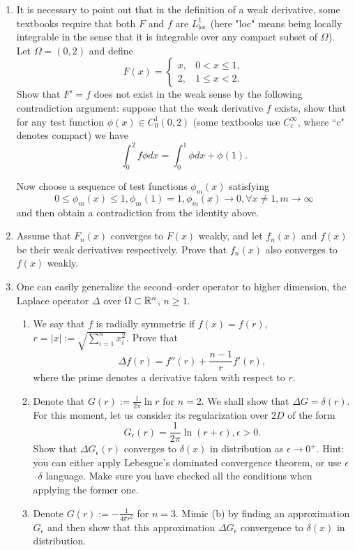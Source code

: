 \documentclass[6pt]{article}
\numberwithin{equation}{section}
\def\mathbb{\Bbb}
\begin{document}
\begin{enumerate}
\item It is necessary to point out that in the definition of a weak derivative, some textbooks require that both $F$ and $f$ are $L^1_{\text{loc}}$ (here "loc" means being locally integrable in the sense that it is integrable over any compact subset of $\Omega$).  Let $\Omega=(0,2)$ and define
\begin{equation}
F(x)=\left\{
\begin{array}{ll}
x,&0<x\leq1,\\
2,&1\leq x<2.
\end{array}
\right.
\end{equation}
Show that $F'=f$ does not exist in the weak sense by the following contradiction argument: suppose that the weak derivative $f$ exists, show that for any test function $\phi(x)\in C^1_0(0,2)$ (some textbooks use $C^\infty_c$, where ``c" denotes compact) we have
\[\int_0^2f \phi dx=\int_0^1 \phi dx+\phi(1).\]

Now choose a sequence of test functions $\phi_m(x)$ satisfying
\[0\leq \phi_m(x)\leq 1, \phi_m(1)=1,\phi_m(x)\rightarrow 0, \forall x\neq1, m\rightarrow\infty\]
and then obtain a contradiction from the identity above.

\item  Assume that $F_n(x)$ converges to $F(x)$ weakly, and let $f_n(x)$ and $f(x)$ be their weak derivatives respectively.  Prove that $f_n(x)$ also converges to $f(x)$ weakly.


\item One can easily generalize the second--order operator to higher dimension, the Laplace operator $\Delta$ over $\Omega\subset\mathbb R^n$, $n\geq1$.
\begin{enumerate}
  \item We say that $f$  is radially symmetric if $f(x)=f(r)$, $r=|x|:=\sqrt{\sum_{i=1}^n x_i^2}$.  Prove that
  \[\Delta f(r)=f''(r)+\frac{n-1}{r}f'(r),\]
where the prime denotes a derivative taken with respect to $r$.
  \item Denote that $G(r):=\frac{1}{2\pi}\ln r$ for $n=2$.  We shall show that $\Delta G=\delta(r)$.  For this moment, let us consider its regularization over $2D$ of the form
      \[G_\epsilon(r)=\frac{1}{2\pi}\ln (r+\epsilon),\epsilon>0.\]
      Show that $\Delta G_\epsilon(r)$ converges to $\delta(x)$ in distribution as $\epsilon\rightarrow 0^+$.  Hint: you can either apply Lebesgue's dominated convergence theorem, or use $\epsilon$--$\delta$ language.  Make sure you have checked all the conditions when applying the former one.
      \item Denote $G(r):=-\frac{1}{4\pi r^2}$ for $n=3$.  Mimic (b) by finding an approximation $G_\epsilon$ and then show that this approximation $\Delta G_\epsilon$ convergence to $\delta(x)$ in distribution.
\end{enumerate}

\end{enumerate}
\end{document}
